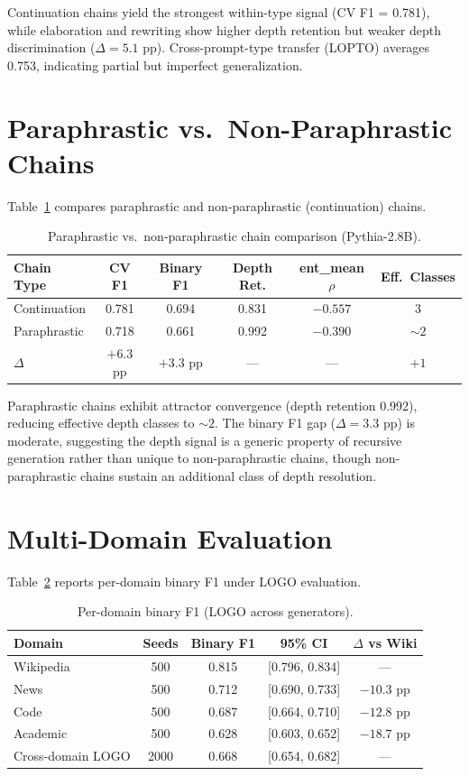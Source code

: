 \documentclass[11pt,a4paper]{article}
\begin{document}
Continuation chains yield the strongest within-type signal (CV F1 = 0.781), while elaboration and rewriting show higher depth retention but weaker depth discrimination ($\Delta = 5.1$ pp). Cross-prompt-type transfer (LOPTO) averages 0.753, indicating partial but imperfect generalization.

\section{Paraphrastic vs.\ Non-Paraphrastic Chains}
\label{app:para}

Table~\ref{tab:para} compares paraphrastic and non-paraphrastic (continuation) chains.

\begin{table}[h]
\centering
\small
\caption{Paraphrastic vs.\ non-paraphrastic chain comparison (Pythia-2.8B).}
\label{tab:para}
\begin{tabular}{lccccc}
\toprule
Chain Type & CV F1 & Binary F1 & Depth Ret. & ent\_mean $\rho$ & Eff.\ Classes \\
\midrule
Continuation & 0.781 & 0.694 & 0.831 & $-0.557$ & 3 \\
Paraphrastic & 0.718 & 0.661 & 0.992 & $-0.390$ & ${\sim}2$ \\
\midrule
$\Delta$ & $+6.3$ pp & $+3.3$ pp & --- & --- & $+1$ \\
\bottomrule
\end{tabular}
\end{table}

Paraphrastic chains exhibit attractor convergence (depth retention 0.992), reducing effective depth classes to ${\sim}2$. The binary F1 gap ($\Delta = 3.3$ pp) is moderate, suggesting the depth signal is a generic property of recursive generation rather than unique to non-paraphrastic chains, though non-paraphrastic chains sustain an additional class of depth resolution.

\section{Multi-Domain Evaluation}
\label{app:domain}

Table~\ref{tab:domain} reports per-domain binary F1 under LOGO evaluation.

\begin{table}[h]
\centering
\small
\caption{Per-domain binary F1 (LOGO across generators).}
\label{tab:domain}
\begin{tabular}{lcccc}
\toprule
Domain & Seeds & Binary F1 & 95\% CI & $\Delta$ vs Wiki \\
\midrule
Wikipedia & 500 & 0.815 & [0.796, 0.834] & --- \\
News & 500 & 0.712 & [0.690, 0.733] & $-10.3$ pp \\
Code & 500 & 0.687 & [0.664, 0.710] & $-12.8$ pp \\
Academic & 500 & 0.628 & [0.603, 0.652] & $-18.7$ pp \\
\midrule
Cross-domain LOGO & 2000 & 0.668 & [0.654, 0.682] & --- \\
\bottomrule
\end{tabular}
\end{table}
\end{document}
